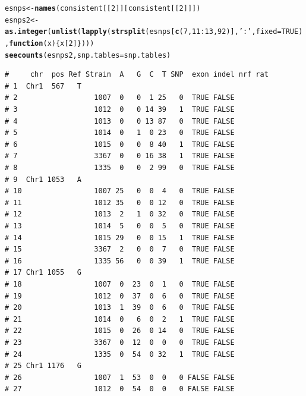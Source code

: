 \documentclass{article}\usepackage[]{graphicx}\usepackage[]{color}
\makeatletter
\newcommand{\hlnum}[1]{\textcolor[rgb]{0.686,0.059,0.569}{#1}}%
\newcommand{\hlstr}[1]{\textcolor[rgb]{0.192,0.494,0.8}{#1}}%
\newcommand{\hlopt}[1]{\textcolor[rgb]{0,0,0}{#1}}%
\newcommand{\hlstd}[1]{\textcolor[rgb]{0.345,0.345,0.345}{#1}}%
\newcommand{\hlkwa}[1]{\textcolor[rgb]{0.161,0.373,0.58}{\textbf{#1}}}%
\newcommand{\hlkwb}[1]{\textcolor[rgb]{0.69,0.353,0.396}{#1}}%
\newcommand{\hlkwc}[1]{\textcolor[rgb]{0.333,0.667,0.333}{#1}}%
\newcommand{\hlkwd}[1]{\textcolor[rgb]{0.737,0.353,0.396}{\textbf{#1}}}%
\newenvironment{kframe}{%
 \def\at@end@of@kframe{}%
 \ifinner\ifhmode%
  \def\at@end@of@kframe{\end{minipage}}%
  \begin{minipage}{\columnwidth}%
 \fi\fi%
 \def\FrameCommand##1{\hskip\@totalleftmargin \hskip-\fboxsep
 \colorbox{shadecolor}{##1}\hskip-\fboxsep
     \hskip-\linewidth \hskip-\@totalleftmargin \hskip\columnwidth}%
 \MakeFramed {\advance\hsize-\width
   \@totalleftmargin\z@ \linewidth\hsize
   \@setminipage}}%
 {\par\unskip\endMakeFramed%
 \at@end@of@kframe}
\newenvironment{knitrout}{}{} %
\makeatother
\begin{document}
\begin{knitrout}\footnotesize
{}\color{fgcolor}\begin{kframe}
\begin{alltt}
\hlstd{esnps} \hlkwb{<-} \hlkwd{names}\hlstd{(consistent[[}\hlnum{2}\hlstd{]][consistent[[}\hlnum{2}\hlstd{]]])}
\hlstd{esnps2} \hlkwb{<-} \hlkwd{as.integer}\hlstd{(}\hlkwd{unlist}\hlstd{(}\hlkwd{lapply}\hlstd{(}\hlkwd{strsplit}\hlstd{(esnps[}\hlkwd{c}\hlstd{(}\hlnum{7}\hlstd{,}\hlnum{11}\hlopt{:}\hlnum{13}\hlstd{,}\hlnum{92}\hlstd{)],}\hlstr{':'}\hlstd{,}\hlkwc{fixed}\hlstd{=}\hlnum{TRUE}\hlstd{),}\hlkwa{function}\hlstd{(}\hlkwc{x}\hlstd{)\{x[}\hlnum{2}\hlstd{]\})))}
\hlkwd{seecounts}\hlstd{(esnps2,}\hlkwc{snp.tables}\hlstd{=snp.tables)}
\end{alltt}
\begin{verbatim}
#     chr  pos Ref Strain  A   G  C  T SNP  exon indel nrf rat
# 1  Chr1  567   T                                            
# 2                  1007  0   0  1 25   0  TRUE FALSE        
# 3                  1012  0   0 14 39   1  TRUE FALSE        
# 4                  1013  0   0 13 87   0  TRUE FALSE        
# 5                  1014  0   1  0 23   0  TRUE FALSE        
# 6                  1015  0   0  8 40   1  TRUE FALSE        
# 7                  3367  0   0 16 38   1  TRUE FALSE        
# 8                  1335  0   0  2 99   0  TRUE FALSE        
# 9  Chr1 1053   A                                            
# 10                 1007 25   0  0  4   0  TRUE FALSE        
# 11                 1012 35   0  0 12   0  TRUE FALSE        
# 12                 1013  2   1  0 32   0  TRUE FALSE        
# 13                 1014  5   0  0  5   0  TRUE FALSE        
# 14                 1015 29   0  0 15   1  TRUE FALSE        
# 15                 3367  2   0  0  7   0  TRUE FALSE        
# 16                 1335 56   0  0 39   1  TRUE FALSE        
# 17 Chr1 1055   G                                            
# 18                 1007  0  23  0  1   0  TRUE FALSE        
# 19                 1012  0  37  0  6   0  TRUE FALSE        
# 20                 1013  1  39  0  6   0  TRUE FALSE        
# 21                 1014  0   6  0  2   1  TRUE FALSE        
# 22                 1015  0  26  0 14   0  TRUE FALSE        
# 23                 3367  0  12  0  0   0  TRUE FALSE        
# 24                 1335  0  54  0 32   1  TRUE FALSE        
# 25 Chr1 1176   G                                            
# 26                 1007  1  53  0  0   0 FALSE FALSE        
# 27                 1012  0  54  0  0   0 FALSE FALSE        

\end{verbatim}
\end{kframe}
\end{knitrout}
\end{document}
